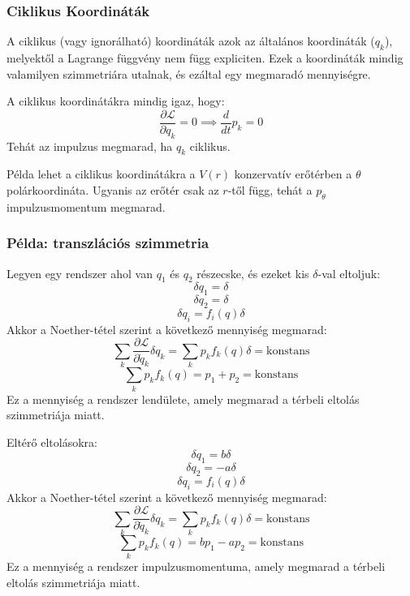 \documentclass[../main.tex]{subfiles}
\begin{document}
\subsubsection{Ciklikus Koordináták}
A ciklikus (vagy ignorálható) koordináták azok az általános koordináták ($q_k$), melyektől a Lagrange függvény nem függ expliciten. Ezek a koordináták mindig valamilyen szimmetriára utalnak, és ezáltal egy megmaradó mennyiségre.

A ciklikus koordinátákra mindig igaz, hogy:
\begin{equation}
    \frac{\partial \mathcal{L}}{\partial q_k} = 0 \implies \frac{d}{dt} p_k = 0
\end{equation}
Tehát az impulzus megmarad, ha $q_k$ ciklikus.

Példa lehet a ciklikus koordinátákra a $V(r)$ konzervatív erőtérben a $\theta$ polárkoordináta. Ugyanis az erőtér csak az $r$-től függ, tehát a $p_\theta$ impulzusmomentum megmarad.

\subsubsection*{Példa: transzlációs szimmetria}
Legyen egy rendszer ahol van $q_1$ és $q_2$ részecske, és ezeket kis $\delta$-val eltoljuk:
\begin{equation}
    \delta q_1 = \delta
\end{equation}
\begin{equation}
    \delta q_2 = \delta
\end{equation}
\begin{equation}
    \delta q_i = f_i(q) \delta
\end{equation}
Akkor a Noether-tétel szerint a következő mennyiség megmarad:
\begin{equation}
    \sum_k \frac{\partial \mathcal{L}}{\partial \dot{q}_k} \delta q_k = \sum_k p_k f_k(q) \delta = \text{konstans}
\end{equation}
\begin{equation}
    \sum_k p_k f_k(q) = p_1 + p_2 = \text{konstans}
\end{equation}
Ez a mennyiség a rendszer lendülete, amely megmarad a térbeli eltolás szimmetriája miatt.

Eltérő eltolásokra:
\begin{equation}
    \delta q_1 = b\delta
\end{equation}
\begin{equation}
    \delta q_2 = - a\delta
\end{equation}
\begin{equation}
    \delta q_i = f_i(q) \delta
\end{equation}
Akkor a Noether-tétel szerint a következő mennyiség megmarad:
\begin{equation}
    \sum_k \frac{\partial \mathcal{L}}{\partial \dot{q}_k} \delta q_k = \sum_k p_k f_k(q) \delta = \text{konstans}
\end{equation}
\begin{equation}
    \sum_k p_k f_k(q) = b p_1 - a p_2 = \text{konstans}
\end{equation}
Ez a mennyiség a rendszer impulzusmomentuma, amely megmarad a térbeli eltolás szimmetriája miatt.
\end{document}
